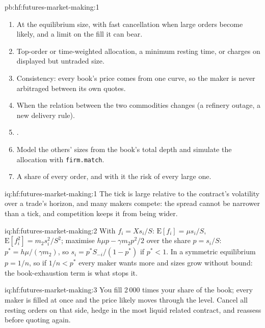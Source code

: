 \begin{solution}{pb:hf:futures-market-making:1}
\begin{enumerate}
2.3 times its wanted inventory at once.
\item At the equilibrium size, with fast cancellation when large orders become likely, and a limit on the fill it can bear.
\item Top-order or time-weighted allocation, a minimum resting time, or charges on displayed but untraded size.
\item Consistency: every book's price comes from one curve, so the maker is never arbitraged between its own quotes.
\item When the relation between the two commodities changes (a refinery outage, a new delivery rule).
\item {}.
\item Model the others' sizes from the book's total depth and simulate the allocation with \texttt{firm.match}.
\item A share of every order, and with it the risk of every large one.
\end{enumerate}
\end{solution}

\begin{solution}{iq:hf:futures-market-making:1}
The tick is large relative to the contract's volatility over a trade's horizon, and many makers compete: the spread cannot be narrower than a tick,
and competition keeps it from being wider.
\end{solution}

\begin{solution}{iq:hf:futures-market-making:2}
With $f_i=Xs_i/S$: $\mathrm{E}[f_i]=\mu s_i/S$, $\mathrm{E}[f_i^2]=m_2s_i^2/S^2$; maximise $h\mu p-\gamma m_2p^2/2$ over the share $p=s_i/S$:
$p^\ast=h\mu/(\gamma m_2)$, so $s_i=p^\ast S_{-i}/(1-p^\ast)$ if $p^\ast<1$. In a symmetric equilibrium $p=1/n$, so if $1/n<p^\ast$ every maker
wants more and sizes grow without bound: the book-exhaustion term is what stops it.
\end{solution}

\begin{solution}{iq:hf:futures-market-making:3}
You fill 2\,000 times your share of the book; every maker is filled at once and the price likely moves through the level. Cancel all resting
orders on that side, hedge in the most liquid related contract, and reassess before quoting again.
\end{solution}

